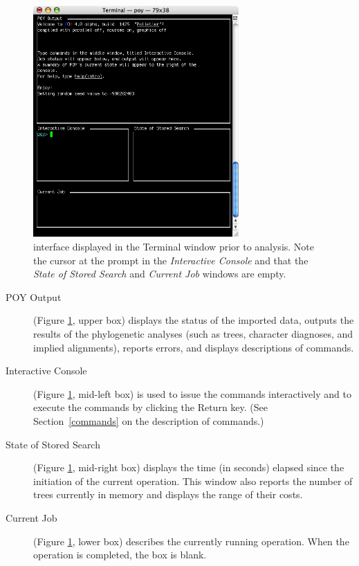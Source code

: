 \begin{figure}[htbp]
   \centering
   \includegraphics[width=0.7\textwidth]{figures/figinterface.jpg}
   \caption{\poy interface displayed in the Terminal window prior to analysis. Note the cursor at the \poy prompt in the \emph{Interactive Console} and that the \emph{State of Stored Search} and \emph{Current Job} windows are empty.}
   \label{fig:figinterface}
\end{figure}

\begin{description}
\item[POY Output] (Figure \ref{fig:figinterface}, upper box) displays the status of the imported data, outputs the results of the phylogenetic analyses (such as trees, character diagnoses, and implied alignments), reports errors, and displays descriptions of \poy commands.
\item[Interactive Console] (Figure \ref{fig:figinterface}, mid-left box) is used to issue the commands interactively and to execute the commands by clicking the Return key. (See Section~\ref{commands} on the description of \poy commands.)
\item[State of Stored Search] (Figure \ref{fig:figinterface}, mid-right box) displays the time (in seconds) elapsed since the initiation of the current operation. This window also reports the number of trees currently in memory and displays the range of their costs.
\item[Current Job] (Figure \ref{fig:figinterface}, lower box) describes the currently running operation. When the operation is completed, the box is blank.
\end{description} 

